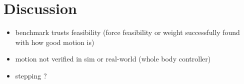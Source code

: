 \section{Discussion} \label{sec:discussion}
\begin{itemize}
  \item benchmark trusts feasibility (force feasibility or weight successfully found with how good motion is)
  \item motion not verified in sim or real-world (whole body controller)
  \item stepping ?
\end{itemize}
